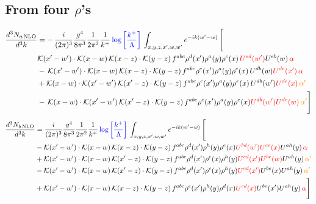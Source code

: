 \documentclass[9pt]{article}
\numberwithin{equation}{section}
\begin{document}
\subsection{From four $\rho$'s}
\begin{align}
    \frac{d^{3}N_{a\,\rm NLO}}{d^{3}k} & = -\,\frac{i}{(2\pi)^{3}}\frac{g^{4}}{8\pi^{3}}\frac{1}{2\pi^{2}} \frac{1}{k^{+}}\,{\color{blue}\log{\left[\frac{k^{+}}{\Lambda}\right]}}\,\int_{x,y,z,x^{\prime},w,w^{\prime}}e^{-ik(w^{\prime}-w)}\, \Bigg[\notag \\ &  \mathcal{K}(x'-w')\cdot \mathcal{K}(x-w)\, \mathcal{K}(x-z)\cdot \mathcal{K}(y-z)\, f^{a b c} \rho^{d}(x') \rho^{a}(y) \rho^{c}(x)\,{\color{red}U^{ed}(w')} U^{e b}(w)\, {\color{red} \alpha} \nonumber\\
    &  -\,\mathcal{K}(x'-w')\cdot \mathcal{K}(x-w)\, \mathcal{K}(x-z)\cdot \mathcal{K}(y-z)\, f^{a b c} \rho^{e}(x') \rho^{a}(y) \rho^{c}(x)\, U^{d b}(w) {\color{red}U^{de}(x')}\, {\color{red} \alpha}\nonumber\\
    & + \mathcal{K}(x-w)\cdot \mathcal{K}(x'-w')\, \mathcal{K}(x'-z)\cdot \mathcal{K}(y-z)\, f^{a b c} \rho^{c}(x') \rho^{a}(y) \rho^{e}(x)\,U^{d b}(w') {\color{red}U^{de}(x)}\, {\color{orange} \alpha'} \nonumber\\
    & -\,\mathcal{K}(x-w)\cdot \mathcal{K}(x'-w')\, \mathcal{K}(x'-z)\cdot \mathcal{K}(y-z)\, f^{a b c} \rho^{c}(x') \rho^{a}(y) \rho^{e}(x) {\color{red}U^{db}(w')} {\color{red}U^{de}(w)}\, {\color{orange} \alpha'}\Bigg]
\end{align}
\begin{align}
      \frac{d^{3}N_{b\,\rm NLO}}{d^{3}k} & = \frac{i}{(2\pi)^{3}}\frac{g^{4}}{8\pi^{3}}\frac{1}{2\pi^{2}} \frac{1}{k^{+}}\,{\color{blue}\log{\left[\frac{k^{+}}{\Lambda}\right]}}\,\int_{x,y,z,x^{\prime},w,w^{\prime}}e^{-ik(w^{\prime}-w)}\, \Bigg[\notag \\ & - \mathcal{K}(x'-w')\cdot \mathcal{K}(x-w)\, \mathcal{K}(x-z)\cdot \mathcal{K}(y-z)\, f^{a b c} \rho^{d}(x') \rho^{h}(y) \rho^{e}(x) {\color{red}U^{bd}(w')} {\color{red}U^{ce}(x)} U^{a h}(y)\, {\color{red} \alpha}\nonumber\\
    &+ \mathcal{K}(x'-w')\cdot \mathcal{K}(x-w)\,\mathcal{K}(x'-z)\cdot \mathcal{K}(y-z)\, f^{a b c} \rho^{d}(x') \rho^{e}(x) \rho^{h}(y) {\color{red}U^{cd}(x')} {\color{red}U^{be}(w)} U^{a h}(y)\, {\color{orange} \alpha'}\nonumber\\
    &- \mathcal{K}(x'-w')\cdot \mathcal{K}(x-w)\,\mathcal{K}(x'-z)\cdot \mathcal{K}(y-z)\, f^{a b c} \rho^{d}(x') \rho^{e}(x) \rho^{h}(y) {\color{red}U^{cd}(x')} U^{b e}(x) U^{a h}(y)\, {\color{orange} \alpha'}\nonumber\\
    &+  \mathcal{K}(x'-w')\cdot \mathcal{K}(x-w)\, \mathcal{K}(x-z)\cdot \mathcal{K}(y-z)\, f^{a b c} \rho^{e}(x') \rho^{h}(y) \rho^{d}(x) {\color{red}U^{cd}(x)} U^{b e}(x') U^{a h}(y)\, {\color{red} \alpha} \Bigg]
\end{align}
\end{document}
